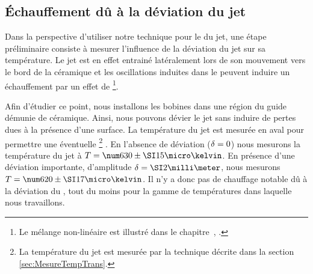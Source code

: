 \subsection{Échauffement dû à la déviation du jet}
Dans la perspective d'utiliser notre technique pour le \rpef du jet, une étape préliminaire consiste à mesurer l'influence de la déviation du jet sur sa température. Le jet est en effet entrainé latéralement lors de son mouvement vers le bord de la céramique et les oscillations induites dans le \ppt peuvent induire un échauffement par un effet de %
\footnote{Le mélange non-linéaire est illustré dans le chapitre~, .}. 


\casse


Afin d'étudier ce point, nous installons les bobines dans une région du guide démunie de céramique. Ainsi, nous pouvons dévier le jet sans induire de pertes dues à la présence d'une surface. La température du jet est mesurée  en aval pour permettre une éventuelle \reth%
\footnote{La température du jet est mesurée par la technique décrite dans la section \vref{sec:MesureTempTrans}.}%
. 
En l'absence de déviation (${\delta}=0$) nous mesurons la température du jet à $T=\microKpm{630}{15}$. En présence d'une déviation importante, d'amplitude $\Devi=\mm{2}$, nous mesurons $T=\microKpm{620}{17}$. 
\Resultat
{
Il n'y a donc pas de chauffage notable dû à la déviation du \jat, tout du moins pour la gamme de températures dans laquelle nous travaillons.
}



